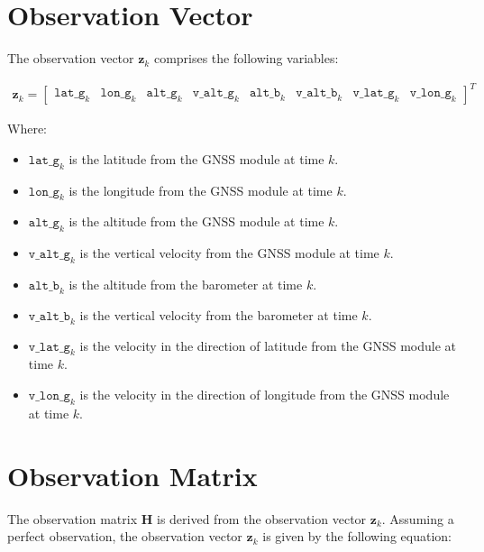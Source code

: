 \section{Observation Vector}
The observation vector $\mathbf{z}_k$ comprises the following variables:

\begin{align}
    \mathbf{z}_k =
    \begin{bmatrix}
        \mathtt{lat\_g}_k &
        \mathtt{lon\_g}_k &
        \mathtt{alt\_g}_k &
        \mathtt{v\_alt\_g}_k &
        \mathtt{alt\_b}_k &
        \mathtt{v\_alt\_b}_k &
        \mathtt{v\_lat\_g}_k &
        \mathtt{v\_lon\_g}_k
    \end{bmatrix}^T
\end{align}

Where:
\begin{itemize}
    \item $\mathtt{lat\_g}_k$ is the latitude from the GNSS module at time $k$.
    \item $\mathtt{lon\_g}_k$ is the longitude from the GNSS module at time $k$.
    \item $\mathtt{alt\_g}_k$ is the altitude from the GNSS module at time $k$.
    \item $\mathtt{v\_alt\_g}_k$ is the vertical velocity from the GNSS module at time $k$.
    \item $\mathtt{alt\_b}_k$ is the altitude from the barometer at time $k$.
    \item $\mathtt{v\_alt\_b}_k$ is the vertical velocity from the barometer at time $k$.
    \item $\mathtt{v\_lat\_g}_k$ is the velocity in the direction of latitude from the GNSS module at time $k$.
    \item $\mathtt{v\_lon\_g}_k$ is the velocity in the direction of longitude from the GNSS module at time $k$.
\end{itemize}


\section{Observation Matrix}
The observation matrix $\mathbf{H}$ is derived from the observation vector $\mathbf{z}_k$.
Assuming a perfect observation, the observation vector $\mathbf{z}_k$ is given by the following equation:

